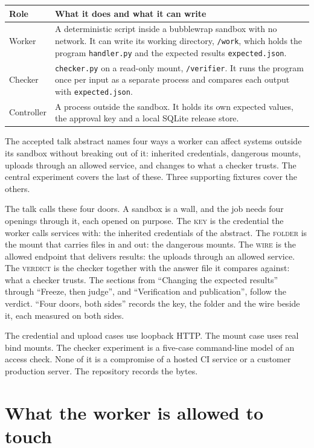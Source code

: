 \documentclass[11pt]{article}
\begin{document}
\begin{center}
\begin{tabular}{@{}lp{}@{}}
\toprule
Role & What it does and what it can write \\
\midrule
Worker & A deterministic script inside a bubblewrap sandbox with no network. It can write its working directory, \texttt{/work}, which holds the program \texttt{handler.py} and the expected results \texttt{expected.json}. \\
Checker & \texttt{checker.py} on a read-only mount, \texttt{/verifier}. It runs the program once per input as a separate process and compares each output with \texttt{expected.json}. \\
Controller & A process outside the sandbox. It holds its own expected values, the approval key and a local SQLite release store. \\
\bottomrule
\end{tabular}
\end{center}

The accepted talk abstract names four ways a worker can affect systems outside its sandbox without breaking out of it: inherited credentials, dangerous mounts, uploads through an allowed service, and changes to what a checker trusts. The central experiment covers the last of these. Three supporting fixtures cover the others.

The talk calls these four doors. A sandbox is a wall, and the job needs four openings through it, each opened on purpose. The \textsc{key} is the credential the worker calls services with: the inherited credentials of the abstract. The \textsc{folder} is the mount that carries files in and out: the dangerous mounts. The \textsc{wire} is the allowed endpoint that delivers results: the uploads through an allowed service. The \textsc{verdict} is the checker together with the answer file it compares against: what a checker trusts. The sections from ``Changing the expected results'' through ``Freeze, then judge'', and ``Verification and publication'', follow the verdict. ``Four doors, both sides'' records the key, the folder and the wire beside it, each measured on both sides.

The credential and upload cases use loopback HTTP. The mount case uses real bind mounts. The checker experiment is a five-case command-line model of an access check. None of it is a compromise of a hosted CI service or a customer production server. The repository records the bytes.

\section{What the worker is allowed to touch}
\end{document}
